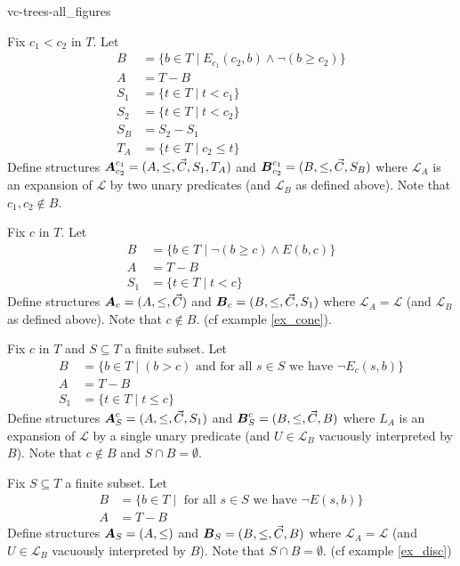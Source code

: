 \documentclass{amsart}
\DeclareMathOperator{\A}{\boldface A}
\DeclareMathOperator{\B}{\boldface B}
\renewcommand{\LL}{\mathcal L}
\begin{document}
 {vc-trees-all_figures}

\begin{Definition}
	Fix $c_1 < c_2$ in $T$. Let
	\begin{align*}
		B &= \{b \in T \mid E_{c_1}(c_2, b) \wedge \neg(b \geq c_2)\} \\
		A &= T - B \\
		S_1 &= \{t \in T \mid t < c_1\} \\
		S_2 &= \{t \in T \mid t < c_2\} \\
		S_B &= S_2 - S_1 \\
		T_A &= \{t \in T \mid c_2 \leq t\}
	\end{align*}
	Define structures $\A^{c_1}_{c_2} = (A, \leq, \vec C, S_1, T_A)$ and $\B^{c_1}_{c_2} = (B, \leq, \vec C, S_B)$ where $\LL_A$ is an expansion of $\LL$ by two unary predicates (and $\LL_B$ as defined above). Note that $c_1, c_2 \notin B$.
\end{Definition}


\begin{Definition}
	Fix $c$ in $T$. Let
	\begin{align*}
		B &= \{b \in T \mid \neg(b \geq c) \wedge E(b,c)\} \\
		A &= T - B \\
		S_1 &= \{t \in T \mid t < c\}
	\end{align*}
	Define structures $\A_{c} = (A, \leq, \vec C)$ and $\B_{c} = (B, \leq, \vec C, S_1)$ where $\LL_A = \LL$ (and $\LL_B$ as defined above). Note that $c \notin B$. (cf example \ref{ex_cone}).
\end{Definition}

\begin{Definition}
	Fix $c$ in $T$ and $S \subseteq T$ a finite subset. Let
	\begin{align*}
		B &= \{b \in T \mid (b > c) \text{ and for all $s \in S$ we have } \neg E_c(s, b)\} \\
		A &= T - B \\
		S_1 &= \{t \in T \mid t \leq c\}
	\end{align*}
	Define structures $\A^{c}_{S} = (A, \leq, \vec C, S_1)$ and $\B^{c}_{S} = (B, \leq, \vec C, B)$ where $L_A$ is an expansion of $\LL$ by a single unary predicate (and $U \in \LL_B$ vacuously interpreted by $B$). Note that $c \notin B$ and $S \cap B = \emptyset$.
\end{Definition}

\begin{Definition}
	Fix $S \subseteq T$ a finite subset. Let
	\begin{align*}
		B &= \{b \in T \mid \text{ for all $s \in S$ we have } \neg E(s, b)\} \\
		A &= T - B
	\end{align*}
	Define structures $\A_{S} = (A, \leq)$ and $\B_{S} = (B, \leq, \vec C, B)$ where $\LL_A = \LL$ (and $U \in \LL_B$ vacuously interpreted by $B$). Note that $S \cap B = \emptyset$. (cf example \ref{ex_disc})
\end{Definition}
\end{document}
